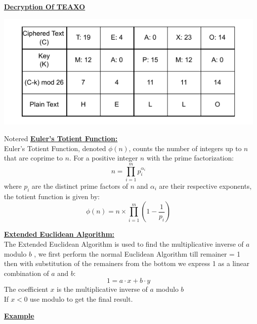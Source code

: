 \vspace{1cm}

\textbf{\underline{Decryption Of TEAXO}}

\vspace{0.25cm}

\begin{center}
    \includegraphics{Chapters/Diagram/Crypto/v2.drawio.pdf}
\end{center}

\newpage

\begin{prettyBox}{Note}{red}
\textbf{\underline{Euler's Totient Function:}}\\[0.15cm]
Euler's Totient Function, denoted \(\phi(n)\), counts the number of integers up to \(n\) that are coprime to \(n\). For a positive integer \(n\) with the prime factorization:
\[
n = \prod_{i=1}^{m} p_i^{\alpha_i}
\]
where \(p_i\) are the distinct prime factors of \(n\) and \(\alpha_i\) are their respective exponents, the totient function is given by:
\[
\phi(n) = n \times \prod_{i=1}^{m} \left(1 - \frac{1}{p_i}\right)
\]
\vspace{0.25cm}

\textbf{\underline{Extended Euclidean Algorithm:}}\\[0.15cm]
The Extended Euclidean Algorithm is used to find the multiplicative inverse of \(a\) modulo \(b\) ,
we first perform the normal Euclidean Algorithm till remainer = 1 then with substitution of the remainers from the bottom we express 1 
as a linear combination of \(a\) and \(b\):
   \[
   1 = a \cdot x + b \cdot y
   \]
The coefficient \(x\) is the multiplicative inverse of \(a\) modulo \(b\)\\[0.1cm]
If \(x < 0\) use modulo to get the final result. 
\end{prettyBox}

\vspace{0.75cm}


\textbf{\underline{Example}}\\[0.15cm]

